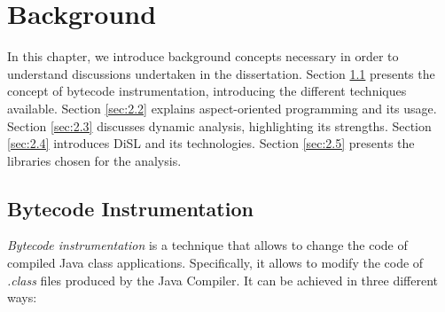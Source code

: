 \documentclass[]{usiinfthesis}
\begin{document}
\chapter{Background} \label{chap:2}

In this chapter, we introduce background concepts necessary in order to understand discussions undertaken in the dissertation. Section \ref{sec:2.1} presents the concept of bytecode instrumentation, introducing the different techniques available. Section \ref{sec:2.2} explains aspect-oriented programming and its usage. Section \ref{sec:2.3} discusses dynamic analysis, highlighting its strengths. Section \ref{sec:2.4} introduces DiSL and its technologies. Section \ref{sec:2.5} presents the libraries chosen for the analysis.

\section{Bytecode Instrumentation} \label{sec:2.1}
\textit{Bytecode instrumentation} is a technique that allows to change the code of compiled Java class applications. Specifically, it allows to modify the code of \textit{.class} files produced by the Java Compiler. It can be achieved in three different ways:
\end{document}
